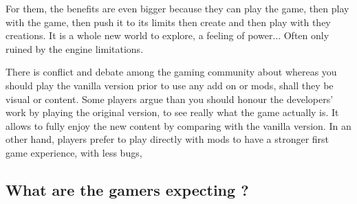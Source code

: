 \documentclass[a4paper,12pt]{article}
\begin{document}
For them, the benefits are even bigger because they can play the game, then play with the game, then push it to its limits then create and then play with they creations. It is a whole new world to explore, a feeling of power... Often only ruined by the engine limitations.

There is conflict and debate among the gaming community about whereas you should play the vanilla version prior to use any add on or mods, shall they be visual or content. Some players argue than you should honour the developers' work by playing the original version, to see really what the game actually is. It allows to fully enjoy the new content by comparing with the vanilla version.
In an other hand, players prefer to play directly with mods to have a stronger first game experience, with less bugs,




\newpage
\subsection{What are the gamers expecting ?}
\end{document}
